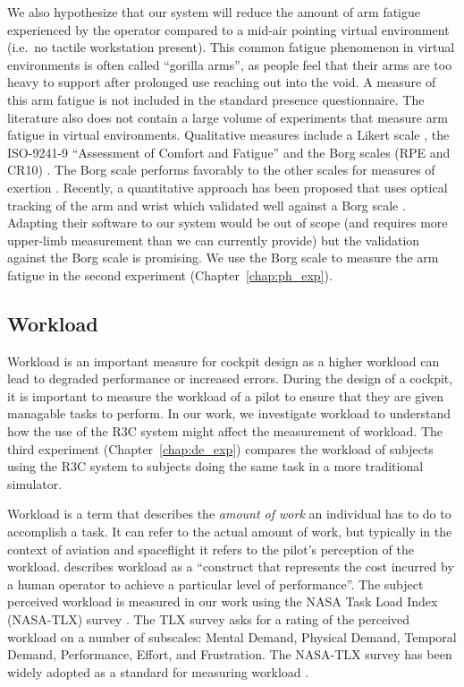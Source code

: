 We also hypothesize that our system will reduce the amount of arm fatigue experienced by the operator compared to a mid-air pointing virtual environment (i.e.\ no tactile workstation present).
This common fatigue phenomenon in virtual environments is often called ``gorilla arms'', as people feel that their arms are too heavy to support after prolonged use reaching out into the void.
A measure of this arm fatigue is not included in the standard presence questionnaire.
The literature also does not contain a large volume of experiments that measure arm fatigue in virtual environments.
Qualitative measures include a Likert scale \citep{likert_technique_1932}, the ISO-9241-9 ``Assessment of Comfort and Fatigue'' and the Borg scales (RPE and CR10) \citep{borg_borgs_1998}.
The Borg scale performs favorably to the other scales for measures of exertion \citep{grant_comparison_1999}.
Recently, a quantitative approach has been proposed that uses optical tracking of the arm and wrist which validated well against a Borg scale \citep{hincapie-ramos_consumed_2014}.
Adapting their software to our system would be out of scope (and requires more upper-limb measurement than we can currently provide) but the validation against the Borg scale is promising.
We use the Borg scale to measure the arm fatigue in the second experiment (Chapter~\ref{chap:ph_exp}).

\subsection{Workload}

Workload is an important measure for cockpit design as a higher workload can lead to degraded performance or increased errors.
During the design of a cockpit, it is important to measure the workload of a pilot to ensure that they are given managable tasks to perform.
In our work, we investigate workload to understand how the use of the R3C system might affect the measurement of workload.
The third experiment (Chapter~\ref{chap:de_exp}) compares the workload of subjects using the R3C system to subjects doing the same task in a more traditional simulator.

Workload is a term that describes the \emph{amount of work} an individual has to do to accomplish a task.
It can refer to the actual amount of work, but typically in the context of aviation and spaceflight it refers to the pilot's perception of the workload.
\citet{hart_development_1988} describes workload as a ``construct that represents the cost incurred by a human operator to achieve a particular level of performance''.
The subject perceived workload is measured in our work using the NASA Task Load Index (NASA-TLX) survey \citep{hart_development_1988}.
The TLX survey asks for a rating of the perceived workload on a number of subscales: Mental Demand, Physical Demand, Temporal Demand, Performance, Effort, and Frustration.
The NASA-TLX survey has been widely adopted as a standard for measuring workload \citep{hart_nasa-task_2006}.

